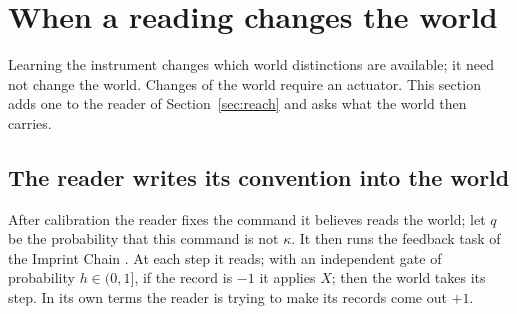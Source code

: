 \documentclass[11pt,a4paper]{article}
\begin{document}
\section{When a reading changes the world}\label{sec:source}

Learning the instrument changes which world distinctions are available; it need not change the world. Changes of the world require an actuator. This section adds one to the reader of Section~\ref{sec:reach} and asks what the world then carries.

\subsection{The reader writes its convention into the world}

After calibration the reader fixes the command it believes reads the world; let $q$ be the probability that this command is not $\kappa$. It then runs the feedback task of the Imprint Chain \cite{ImprintChain}. At each step it reads; with an independent gate of probability $h\in(0,1]$, if the record is $-1$ it applies $X$; then the world takes its step. In its own terms the reader is trying to make its records come out $+1$.
\end{document}
